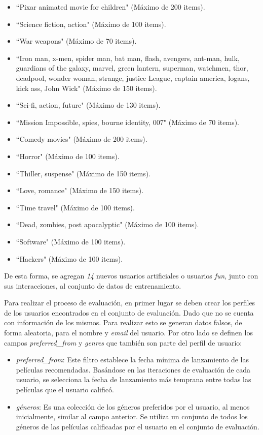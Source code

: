 \documentclass[11pt,a4paper,twoside]{thesis}
\newcommand{\quotes}[1]{``#1"}
\begin{document}
\begin{itemize}
	\item \quotes{Pixar animated movie for children} (Máximo de 200 items).
	\item \quotes{Science fiction, action} (Máximo de 100 items).
	\item \quotes{War weapons} (Máximo de 70 items).
	\item \quotes{Iron man, x-men, spider man, bat man, flash, avengers, ant-man, hulk, guardians of the galaxy, marvel, green lantern, superman, watchmen, thor, deadpool, wonder woman, strange, justice League, captain america, logans, kick ass, John Wick} (Máximo de 150 items).
	\item \quotes{Sci-fi, action, future} (Máximo de 130 items).
	\item \quotes{Mission Impossible, spies, bourne identity, 007} (Máximo de 70 items).
	\item \quotes{Comedy movies} (Máximo de 200 items).
	\item \quotes{Horror} (Máximo de 100 items).
	\item \quotes{Thiller, suspense} (Máximo de 150 items).
	\item \quotes{Love, romance} (Máximo de 150 items).
	\item \quotes{Time travel} (Máximo de 100 items).
	\item \quotes{Dead, zombies, post apocalyptic} (Máximo de 100 items).
	\item \quotes{Software} (Máximo de 100 items).
	\item \quotes{Hackers} (Máximo de 100 items).
\end{itemize}

De esta forma, se agregan \textit{14} nuevos usuarios artificiales o usuarios \textit{fun}, junto con sus interacciones, al conjunto de datos de entrenamiento.

Para realizar el proceso de evaluación, en primer lugar se deben crear los perfiles de los usuarios encontrados en el conjunto de evaluación. Dado que no se cuenta con información de los mismos. Para realizar esto se generan datos falsos, de forma aleatoria, para el nombre y \textit{email} del usuario. Por otro lado se definen los campos \textit{preferred\_from} y
\textit{genres} que también son parte del perfil de usuario:


\begin{itemize}
	\item \textit{preferred\_from}: Este filtro establece la fecha mínima de lanzamiento de las películas recomendadas. Basándose en las iteraciones de evaluación de cada usuario, se selecciona la fecha de lanzamiento más temprana entre todas las películas que el usuario calificó.
	\item \textit{géneros}: Es una colección de los géneros preferidos por el usuario, al menos inicialmente, similar al campo anterior. Se utiliza un conjunto de todos los géneros de las películas calificadas por el usuario en el conjunto de evaluación.
\end{itemize}
\end{document}
